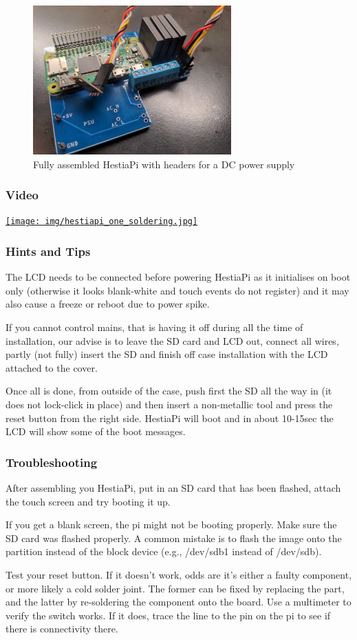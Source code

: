 \begin{figure}
  \centering
  \includegraphics[width=3in]{img/fully_assembled.jpg}
  \caption{Fully assembled HestiaPi with headers for a DC power supply}
  \label{fig:fully_assembled}
\end{figure}

\subsubsection{Video}
\href{https://www.youtube.com/watch?v=gRcRINqT31g}{\texttt{[image: img/hestiapi\_one\_soldering.jpg]}}

\subsubsection{Hints and Tips}
The LCD needs to be connected before powering HestiaPi as it initialises on
boot only (otherwise it looks blank-white and touch events do not register) and
it may also cause a freeze or reboot due to power spike.

If you cannot control mains, that is having it off during all the time of
installation, our advise is to leave the SD card and LCD out, connect all
wires, partly (not fully) insert the SD and finish off case installation with
the LCD attached to the cover.

Once all is done, from outside of the case, push first the SD all the way in
(it does not lock-click in place) and then insert a non-metallic tool and press
the reset button from the right side. HestiaPi will boot and in about 10-15sec
the LCD will show some of the boot messages.

\subsubsection{Troubleshooting}
After assembling you HestiaPi, put in an SD card that has been flashed, attach
the touch screen and try booting it up.

If you get a blank screen, the pi might not be booting properly.  Make sure the
SD card was flashed properly.  A common mistake is to flash the image onto the
partition instead of the block device (e.g., /dev/sdb1 instead of /dev/sdb).

Test your reset button.  If it doesn't work, odds are it's either a faulty
component, or more likely a cold solder joint.  The former can be fixed by
replacing the part, and the latter by re-soldering the component onto the
board.  Use a multimeter to verify the switch works.  If it does, trace the
line to the pin on the pi to see if there is connectivity there.
